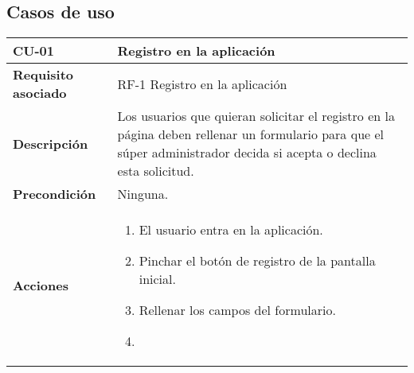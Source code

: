 \subsection{Casos de uso}
\begin{longtable}[H]{@{}ll@{}}
\toprule
\begin{minipage}[b]{0.23\columnwidth}\raggedright\strut
\textbf{CU-01}\strut
\end{minipage} & \begin{minipage}[b]{0.71\columnwidth}\raggedright\strut
\textbf{Registro en la aplicación}\strut
\end{minipage}\tabularnewline
\midrule
\endhead
\begin{minipage}[t]{0.23\columnwidth}\raggedright\strut
\textbf{Requisito asociado}\strut
\end{minipage} & \begin{minipage}[t]{0.71\columnwidth}\raggedright\strut
RF-1 Registro en la aplicación\strut
\end{minipage}\tabularnewline
\begin{minipage}[t]{0.23\columnwidth}\raggedright\strut
\textbf{Descripción}\strut
\end{minipage} & \begin{minipage}[t]{0.71\columnwidth}\raggedright\strut
Los usuarios que quieran solicitar el registro en la página deben rellenar un
formulario para que el súper administrador decida si acepta o declina esta
solicitud.\strut
\end{minipage}\tabularnewline
\begin{minipage}[t]{0.23\columnwidth}\raggedright\strut
\textbf{Precondición}\strut
\end{minipage} & \begin{minipage}[t]{0.71\columnwidth}\raggedright\strut
Ninguna.\strut
\end{minipage}\tabularnewline
\begin{minipage}[t]{0.23\columnwidth}\raggedright\strut
\textbf{Acciones}\strut
\end{minipage} & \begin{minipage}[t]{0.71\columnwidth}\raggedright\strut
\begin{enumerate}
\def\labelenumi{\arabic{enumi}.}
\tightlist
\item
  El usuario entra en la aplicación.
\item
  Pinchar el botón de registro de la pantalla inicial.
\item
Rellenar los campos del formulario.
\item

\end{enumerate}
\end{minipage}
\end{longtable}
